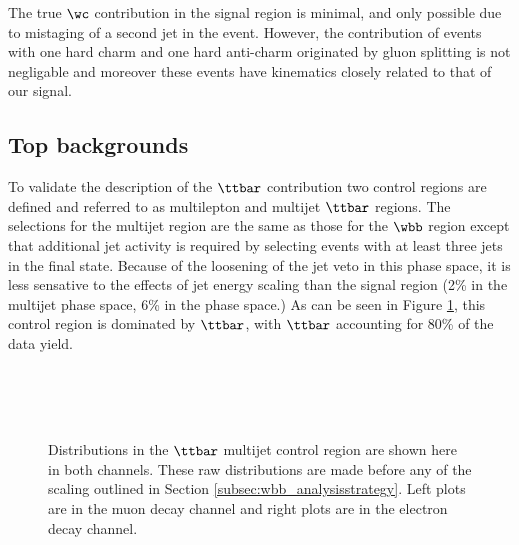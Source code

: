 The true $\wc$ contribution in the signal region is minimal, 
and only possible due to mistaging of a second jet in
the event. However, the contribution of events
with one hard charm and one hard anti-charm originated by gluon 
splitting is not negligable and moreover these events have kinematics closely related 
to that of our signal. 

\subsection{Top backgrounds}
\label{section:topbackgrounds}

To validate the description of the $\ttbar$ contribution two 
 control regions are defined and referred to as multilepton 
 and multijet $\ttbar$ regions.
The selections for the multijet region are the same as 
 those for the $\wbb$ region except that additional jet
 activity is required by selecting events with at least
 three jets in the final state. 
Because of the loosening of the jet veto in this phase space,
 it is less sensative to the effects of jet energy scaling
 than the signal region (2\% in the \ttbar multijet phase space,
 6\% in the \wbb phase space.)
As can be seen in Figure \ref{fig:prefit_ttjjj},
 this control region is dominated by $\ttbar$, with $\ttbar$ accounting for
 80\% of the data yield.

\begin{figure}
      \center
     \\
     \\
     \\
      \caption{Distributions in the $\ttbar$ multijet control region are shown here in both channels.
       These raw distributions are made before any of the scaling outlined in Section \ref{subsec:wbb_analysisstrategy}.
       Left plots are in the muon decay channel and right
        plots are in the electron decay channel.
      }
      \label{fig:prefit_ttjjj}
\end{figure}


